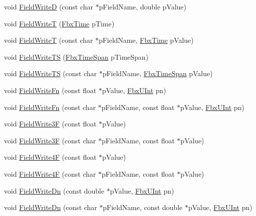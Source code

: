 \begin{Indent}
\begin{DoxyCompactItemize}
\item 
void \hyperlink{class_fbx_i_o_a139783b3c68372360ba97acb927ede2d}{Field\+WriteD} (const char $\ast$p\+Field\+Name, double p\+Value)
\item 
void \hyperlink{class_fbx_i_o_a8bfba5de4219faf4fd55556c6e8f1494}{Field\+WriteT} (\hyperlink{class_fbx_time}{Fbx\+Time} p\+Time)
\item 
void \hyperlink{class_fbx_i_o_a83e5aede6a13095e5c341245459a448e}{Field\+WriteT} (const char $\ast$p\+Field\+Name, \hyperlink{class_fbx_time}{Fbx\+Time} p\+Value)
\item 
void \hyperlink{class_fbx_i_o_ac87f59973fcbd09f3866ff9b08ea3fb0}{Field\+Write\+TS} (\hyperlink{class_fbx_time_span}{Fbx\+Time\+Span} p\+Time\+Span)
\item 
void \hyperlink{class_fbx_i_o_a3ba9e3898cefb758990509ccd76c254a}{Field\+Write\+TS} (const char $\ast$p\+Field\+Name, \hyperlink{class_fbx_time_span}{Fbx\+Time\+Span} p\+Value)
\item 
void \hyperlink{class_fbx_i_o_ae5f4c87e58130bb99901fcbff94c4011}{Field\+Write\+Fn} (const float $\ast$p\+Value, \hyperlink{fbxtypes_8h_ae9fb141d8158a730aa85ec5ff2ea3f6b}{Fbx\+U\+Int} pn)
\item 
void \hyperlink{class_fbx_i_o_a7f98be1e94aeef3d50bf11993cf41f78}{Field\+Write\+Fn} (const char $\ast$p\+Field\+Name, const float $\ast$p\+Value, \hyperlink{fbxtypes_8h_ae9fb141d8158a730aa85ec5ff2ea3f6b}{Fbx\+U\+Int} pn)
\item 
void \hyperlink{class_fbx_i_o_a0f6d181f3a938935b34c5a82a41d000f}{Field\+Write3F} (const float $\ast$p\+Value)
\item 
void \hyperlink{class_fbx_i_o_aa2c2df36a89f3e16f0f6029eb5132f26}{Field\+Write3F} (const char $\ast$p\+Field\+Name, const float $\ast$p\+Value)
\item 
void \hyperlink{class_fbx_i_o_abc796d38e6392b1e0d7ec3836ddd0afb}{Field\+Write4F} (const float $\ast$p\+Value)
\item 
void \hyperlink{class_fbx_i_o_ae62b4899ca45c340663c6589ed2f653d}{Field\+Write4F} (const char $\ast$p\+Field\+Name, const float $\ast$p\+Value)
\item 
void \hyperlink{class_fbx_i_o_a8cd415bcad232d9982183c4bbdee1931}{Field\+Write\+Dn} (const double $\ast$p\+Value, \hyperlink{fbxtypes_8h_ae9fb141d8158a730aa85ec5ff2ea3f6b}{Fbx\+U\+Int} pn)
\item 
void \hyperlink{class_fbx_i_o_aa35256edab680c12ab62b613695bf23c}{Field\+Write\+Dn} (const char $\ast$p\+Field\+Name, const double $\ast$p\+Value, \hyperlink{fbxtypes_8h_ae9fb141d8158a730aa85ec5ff2ea3f6b}{Fbx\+U\+Int} pn)

\end{DoxyCompactItemize}
\end{Indent}

